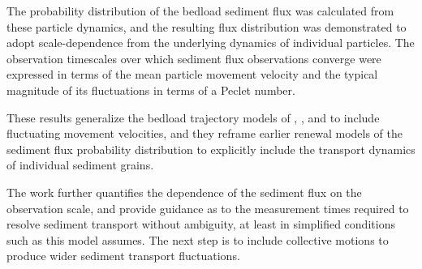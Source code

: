 The probability distribution of the bedload sediment flux was calculated from these particle dynamics, and the resulting flux distribution was demonstrated to adopt scale-dependence from the underlying dynamics of individual particles.
The observation timescales over which sediment flux observations converge were expressed in terms of the mean particle movement velocity and the typical magnitude of its fluctuations in terms of a Peclet number.
 
These results generalize the bedload trajectory models of \citet{Einstein1937}, \citet{Lisle1998}, and \citet{Lajeunesse2017} to include fluctuating movement velocities, and they reframe earlier renewal models of the sediment flux probability distribution \citep{Lajeunesse2010,Ancey2020} to explicitly include the transport dynamics of individual sediment grains.
 
The work further quantifies the dependence of the sediment flux on the observation scale, and provide guidance as to the measurement times required to resolve sediment transport without ambiguity, at least in simplified conditions such as this model assumes.
The next step is to include collective motions to produce wider sediment transport fluctuations.

\endinput
Introducing such a description with the stochastic Exner equation would lend new mathematical language to the old unsolved problem in geomorphology: how does variability affect landscape evolution?
The classic works all acknowledge variability \citep{Leopold1952}, although one of their main efforts was to construct strategies to describe landscapes without explicitly accounting for it, producing ideas like competent flows to summarize climatic variability \citep{Wolman1960}, characteristic grain sizes to overcome sorting processes \citep{Parker1982}, or average flow energies to avoid turbulence \citep{Bagnold1954}.
Progress in stochastic approaches to river science \citep[e.g.][]{Furbish2021c,Ancey2020b} invites us to step beyond averaged descriptions, propagate noises through the governing equations of landscape evolution, and ask again with these classic works to what extent fluctuations shape Earth's surface.



